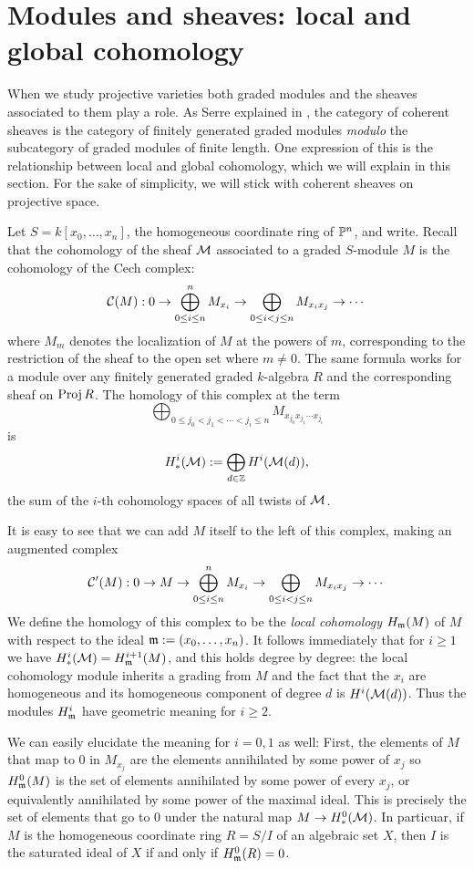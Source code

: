 \section{Modules and sheaves: local and global cohomology}

When we study projective varieties both graded modules and the sheaves associated to them play a role. As Serre explained in \cite{FAC}, the category of coherent sheaves is the category of finitely generated graded modules \emph{modulo} the subcategory of graded modules of finite length. One expression of this is the relationship between local and global cohomology, which we will explain in this section. For the sake of simplicity, we will stick with coherent sheaves on projective space.

Let $S= k[x_{0}, \dots, x_{n}]$, the homogeneous coordinate ring of $\PP^{n}$, and write. Recall that the cohomology of the sheaf $\cM$ associated to a graded $S$-module $M$ is the cohomology of the Cech complex:
$$
\cC(M): 0\to \bigoplus_{0\leq i \leq n}^{n} M_{x_{i}} \to \bigoplus_{0\leq i<j\leq n} M_{x_{i}x_{j}} \to \cdots
$$
where $M_{m}$ denotes the localization of $M$ at the powers of $m$, corresponding to the restriction of the sheaf to the open set where $m \neq 0$. The same formula works for a module 
over any finitely generated graded $k$-algebra $R$ and the corresponding sheaf on $\Proj R$.
The homology of this complex at the term
$$
\bigoplus_{0\leq j_{0}<j_{1}<\cdots<j_{i}\leq n} M_{x_{j_{0}}x_{j_{1}}\cdots x_{j_{i}}}
$$
is 
$$
H^{i}_{*}(\cM):= \bigoplus_{d\in \ZZ} H^{i}(\cM(d)),
$$
the sum of the $i$-th cohomology spaces of all twists of $\cM$.

It is easy to see that we can add $M$ itself to the left of this complex, making an augmented complex
$$
\cC'(M): 0\to M \to \bigoplus_{0\leq i \leq n}^{n} M_{x_{i}} \to \bigoplus_{0\leq i<j\leq n} M_{x_{i}x_{j}} \to \cdots
$$
We define the homology of this complex to be the \emph{local cohomology} $H_{\gm}(M)$ of $M$ with respect to the ideal $\gm := (x_{0},\dots,x_{n})$. It follows immediately that for $i\geq 1$ we have
$H^{i}_{*}(\cM) = H^{i+1}_{\gm}(M)$, and this holds degree by degree: the local cohomology module inherits a grading from $M$ and the fact that the $x_{i}$ are homogeneous and its homogeneous component of degree $d$ is
$H^{i}(\cM(d))$. Thus the modules $H_{\gm}^{i}$ have geometric meaning for $i\geq 2$. 

We can easily elucidate the meaning for $i=0,1$ as well: First, the elements of $M$ that map to 0 in $M_{x_{j}}$ are the elements annihilated by some power of $x_{j}$ so $H^{0}_{\gm}(M)$ is the set of elements annihilated by some power of every $x_{j}$, or equivalently annihilated by some power of the maximal ideal. This is precisely the set of elements that go to 0 under the natural map
$M\to H^{0}_{*}(\cM)$.  In particuar, if
$M$ is the homogeneous coordinate ring $R = S/I$ of an algebraic set $X$, then $I$ is the saturated ideal of $X$ if and only if $H^{0}_{\gm}(R) = 0$.

